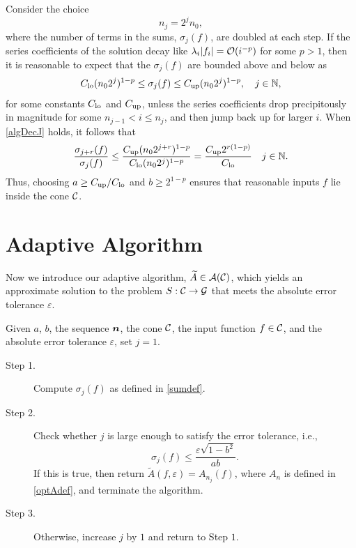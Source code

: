 \documentclass[graybox,footinfo]{svmult}
\newcommand{\DHJRabs}[1]{\ensuremath{{\left \lvert #1 \right \rvert}}}
\begin{document}
Consider the choice 
\begin{equation} \label{geonj}
n_j = 2^{j}n_0,
\end{equation}
where the number of terms in the sums, $\sigma_j(f)$, are doubled at each step.  If the series coefficients of the solution decay like $\lambda_{i} \DHJRabs{f_{i}} = \calO(i^{-p})$ for some $p>1$, then it is reasonable to expect that the $\sigma_j(f)$ are bounded above and below as
\begin{equation} \label{algDecJ}
C_{\textup{lo}} (n_02^j)^{1-p} \le \sigma_j(f) \le C_{\textup{up}} (n_02^j)^{1-p}, \quad   j \in \bbN,
\end{equation}
for some constants $C_{\textup{lo}}$ and $C_{\textup{up}}$, unless the series coefficients drop precipitously in magnitude for some $n_{j-1} < i \le n_j$, and then jump back up for larger $i$.  When \eqref{algDecJ} holds, it follows that
\begin{equation*} 
\frac{\sigma_{j+r}(f)}{\sigma_j(f)} \le \frac{C_{\textup{up}} (n_02^{j+r})^{1-p}}{C_{\textup{lo}} (n_02^j)^{1-p}} = \frac{C_{\textup{up}} 2^{r(1-p)}}{C_{\textup{lo}}}\quad   j \in {\mathbb{N}}.
\end{equation*}
Thus, choosing $a \ge C_{\textup{up}}/C_{\textup{lo}}$ and $b \ge 2^{1-p}$ ensures that reasonable inputs $f$ lie inside the cone ${\mathcal{C}}$.


\section{Adaptive Algorithm} \label{sec:adaptalgo}

Now we introduce our adaptive algorithm, $\widetilde{A} \in {\mathcal{A}}({\mathcal{C}})$, which yields an approximate solution to the problem $S:{\mathcal{C}}\rightarrow{\mathcal{G}}$ that meets the absolute error tolerance $\varepsilon$.

\begin{algo}\label{algo2}
Given $a$, $b$, the sequence ${\boldsymbol{n}}$, the cone ${\mathcal{C}}$, the input function $f \in {\mathcal{C}}$, and the absolute error tolerance $\varepsilon$, set $j=1$.
\begin{description}
\item[Step 1.] Compute $\sigma_{j}(f)$ as defined in \eqref{sumdef}.
\item[Step 2.] Check whether $j$ is large enough to satisfy the error tolerance, i.e.,
    \begin{equation}\label{covcrit}
          \sigma_{j}(f) \le \frac{\varepsilon\sqrt{1 - b^2}}{ab} .
    \end{equation}
    If this is true, then return $\widetilde{A}(f,\varepsilon) = A_{n_{j}}(f)$, where $A_n$ is defined in \eqref{optAdef}, and terminate the algorithm.
\item[Step 3.] Otherwise, increase $j$ by $1$ and return to Step $1$.
\end{description}
\end{algo}
\end{document}
